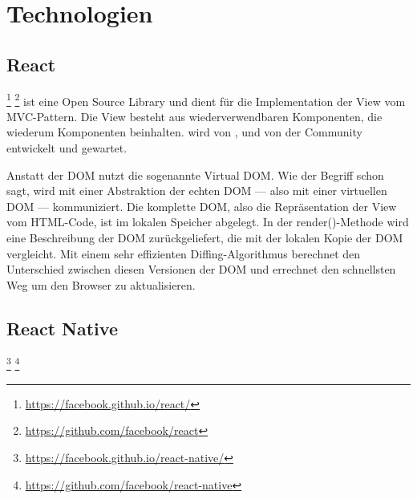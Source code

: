 \chapter{Technologien}
\label{pd-technologien}

\section{React} 
\footnote{\url{https://facebook.github.io/react/}} \footnote{\url{https://github.com/facebook/react}} ist eine Open Source  \gls{Library} und dient für die Implementation der View vom \gls{MVC}-Pattern. 
Die View besteht aus wiederverwendbaren Komponenten, die wiederum Komponenten beinhalten.
 wird von ,  und von der Community entwickelt und gewartet. 
\cite{react}



Anstatt der \gls{DOM} nutzt  die sogenannte \gls{Virtual DOM}.
Wie der Begriff schon sagt, wird mit einer Abstraktion der echten \gls{DOM} --- also mit einer virtuellen DOM --- kommuniziert.
Die komplette \gls{DOM}, also die Repräsentation der View vom HTML-Code, ist im lokalen Speicher abgelegt.\cite{virtual-dom} 
In der render()-Methode wird eine Beschreibung der DOM zurückgeliefert, die  mit der lokalen Kopie der \gls{DOM} vergleicht.
Mit einem sehr effizienten Diffing-Algorithmus berechnet  den Unterschied zwischen diesen  Versionen der \gls{DOM} und errechnet den schnellsten Weg um den Browser zu aktualisieren. 
\cite{react-virtual-dom}



\section{React Native}
\footnote{\url{https://facebook.github.io/react-native/}} \footnote{\url{https://github.com/facebook/react-native}} 


